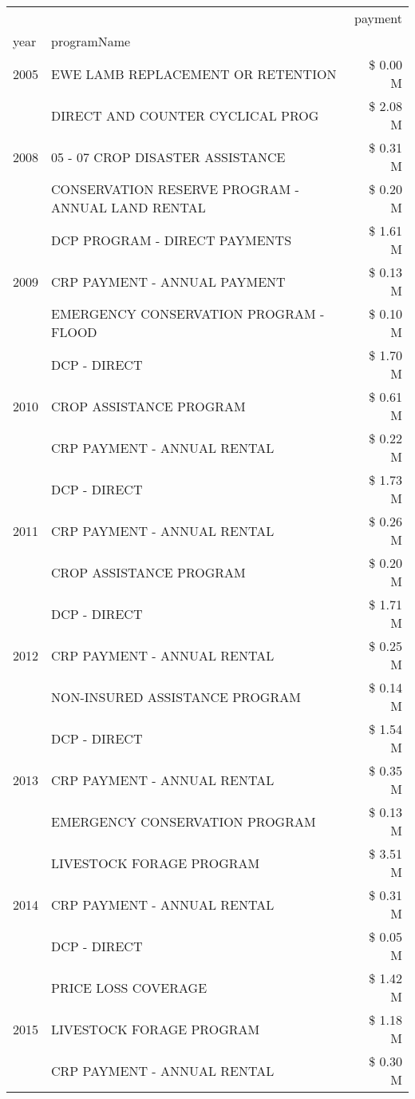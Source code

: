 \begin{tabular}{llr}
\toprule
 &  & payment \\
year & programName &  \\
\midrule
2005 & EWE LAMB REPLACEMENT OR RETENTION & \$ 0.00 M \\
\cline{1-3}
\multirow[t]{3}{*}{2008} & DIRECT AND COUNTER CYCLICAL PROG & \$ 2.08 M \\
 & 05 - 07 CROP DISASTER ASSISTANCE & \$ 0.31 M \\
 & CONSERVATION RESERVE PROGRAM - ANNUAL LAND RENTAL & \$ 0.20 M \\
\cline{1-3}
\multirow[t]{3}{*}{2009} & DCP PROGRAM - DIRECT PAYMENTS & \$ 1.61 M \\
 & CRP PAYMENT - ANNUAL PAYMENT & \$ 0.13 M \\
 & EMERGENCY CONSERVATION PROGRAM - FLOOD & \$ 0.10 M \\
\cline{1-3}
\multirow[t]{3}{*}{2010} & DCP - DIRECT & \$ 1.70 M \\
 & CROP ASSISTANCE PROGRAM & \$ 0.61 M \\
 & CRP PAYMENT - ANNUAL RENTAL & \$ 0.22 M \\
\cline{1-3}
\multirow[t]{3}{*}{2011} & DCP - DIRECT & \$ 1.73 M \\
 & CRP PAYMENT - ANNUAL RENTAL & \$ 0.26 M \\
 & CROP ASSISTANCE PROGRAM & \$ 0.20 M \\
\cline{1-3}
\multirow[t]{3}{*}{2012} & DCP - DIRECT & \$ 1.71 M \\
 & CRP PAYMENT - ANNUAL RENTAL & \$ 0.25 M \\
 & NON-INSURED ASSISTANCE PROGRAM & \$ 0.14 M \\
\cline{1-3}
\multirow[t]{3}{*}{2013} & DCP - DIRECT & \$ 1.54 M \\
 & CRP PAYMENT - ANNUAL RENTAL & \$ 0.35 M \\
 & EMERGENCY CONSERVATION PROGRAM & \$ 0.13 M \\
\cline{1-3}
\multirow[t]{3}{*}{2014} & LIVESTOCK FORAGE PROGRAM & \$ 3.51 M \\
 & CRP PAYMENT - ANNUAL RENTAL & \$ 0.31 M \\
 & DCP - DIRECT & \$ 0.05 M \\
\cline{1-3}
\multirow[t]{3}{*}{2015} & PRICE LOSS COVERAGE & \$ 1.42 M \\
 & LIVESTOCK FORAGE PROGRAM & \$ 1.18 M \\
 & CRP PAYMENT - ANNUAL RENTAL & \$ 0.30 M \\

\end{tabular}
